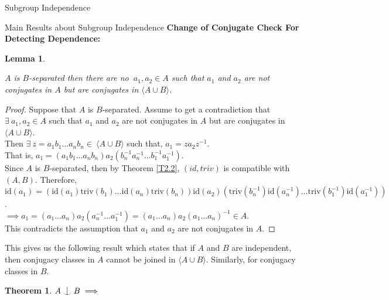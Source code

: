 \documentclass{article}
\newtheorem{theorem}{Theorem}[section]
\newtheorem{lemma}{Lemma}[section]
\def\indep{\mathrel{\raise0.2ex\hbox{\ooalign{\hidewidth$\vert$\hidewidth\cr\raise-0.9ex\hbox{$\smile$}}}}}
\begin{document}
\begin{section}{Subgroup Independence}
\begin{subsection}{Main Results about Subgroup Independence}
			\noindent \textbf{Change of Conjugate Check For Detecting Dependence:}
			
			\begin{lemma}\label{ConjLemma}
				
				\noindent  $A$ is $B$-separated  then 
				there are no $\ a_1, a_2 \in A$ such that $a_1$ and $a_2$ are not conjugates in $A$ but are conjugates in $\langle  A \cup B\rangle $. \\
			\end{lemma}
			
			\begin{proof}
				Suppose that $A$ is $B$-separated. Assume to get a contradiction that $\exists \ a_1, a_2 \in A$ such that $a_1$ and $a_2$ are not conjugates in $A $ but are conjugates in $\langle  A \cup B\rangle $.\\
				
				Then $\exists \ z = a_1b_1 \dots a_nb_n  \in \  \langle  A \cup B\rangle $ such that, $ a_1 = z a_2 z^{-1}$.\\
				
				That is, $a_1 = (a_1b_1 \dots a_nb_n)a_2 (b_n^{-1}a_n^{-1} \dots b_1^{-1}a_1^{-1})$.\\
				
				Since $A$ is $B$-separated, then by Theorem \ref{T2.2},  $(id, triv)$ is compatible with $(A, B)$.  Therefore, \\
				
				\noindent $\text{id}(a_1) = (\text{id}(a_1)\text{triv}(b_1) \dots \text{id}(a_n)\text{triv}(b_n)) \text{id}(a_2) (\text{triv}(b_n^{-1})\text{id}(a_n^{-1}) \dots \text{triv}(b_1^{-1})\text{id}(a_1^{-1}))$.\\
				
				\noindent $\implies a_1 = (a_1\dots a_n) a_2(a_n^{-1} \dots a_1^{-1}) = (a_1\dots a_n) a_2(a_1\dots a_n) ^{-1} \in A.$\\
				
				This contradicts the assumption that $a_1$ and $a_2$ are not conjugates in $A$.
			\end{proof}	
			
			
			This gives us the following result which states that if $A$ and $B$ are independent, then conjugacy classes in $A$ cannot be joined in  $\langle  A \cup B\rangle $. Similarly, for conjugacy classes in $B$. 
			
			
			
			\begin{theorem}\label{ConjCheck}
				$A \indep B \implies$\\
				

\end{theorem}
\end{subsection}
\end{section}
\end{document}
